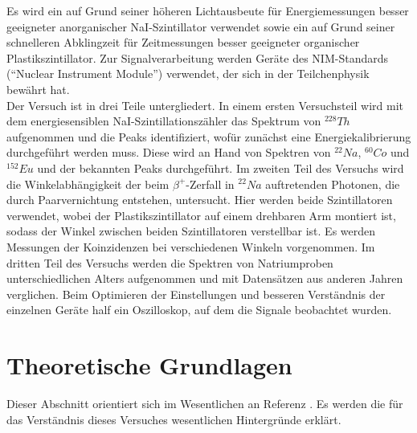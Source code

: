 \documentclass[12pt,listof=totoc]{scrartcl}
\begin{document}
Es wird ein auf Grund seiner höheren Lichtausbeute für Energiemessungen besser geeigneter anorganischer NaI-Szintillator verwendet sowie ein auf Grund seiner schnelleren Abklingzeit für Zeitmessungen besser geeigneter organischer Plastikszintillator.
Zur Signalverarbeitung werden Geräte des NIM-Standards ("`Nuclear Instrument Module"') verwendet, der sich in der Teilchenphysik bewährt hat.\\

Der Versuch ist in drei Teile untergliedert. 
In einem ersten Versuchsteil wird mit dem energiesensiblen NaI-Szintillationszähler das Spektrum von $^{228}Th$ aufgenommen und die Peaks identifiziert, wofür zunächst eine Energiekalibrierung durchgeführt werden muss. Diese wird an Hand von Spektren von  $^{22}Na$, $^{60}Co$ und $^{152}Eu$ und der bekannten Peaks durchgeführt.
Im zweiten Teil des Versuchs wird die Winkelabhängigkeit der beim $\beta^{+}$-Zerfall in $^{22}Na$ auftretenden Photonen, die durch Paarvernichtung entstehen, untersucht. Hier werden beide Szintillatoren verwendet, wobei der Plastikszintillator auf einem drehbaren Arm montiert ist, sodass der Winkel zwischen beiden Szintillatoren verstellbar ist. Es werden Messungen der Koinzidenzen bei verschiedenen Winkeln vorgenommen.
Im dritten Teil des Versuchs werden die Spektren von Natriumproben unterschiedlichen Alters aufgenommen und mit Datensätzen aus anderen Jahren verglichen.
Beim Optimieren der Einstellungen und besseren Verständnis der einzelnen Geräte half ein Oszilloskop, auf dem die Signale beobachtet wurden.



\newpage
\section{Theoretische Grundlagen}

Dieser Abschnitt orientiert sich im Wesentlichen an Referenz \cite{staat}. Es werden die für das Verständnis dieses Versuches wesentlichen Hintergründe erklärt. 
\end{document}

